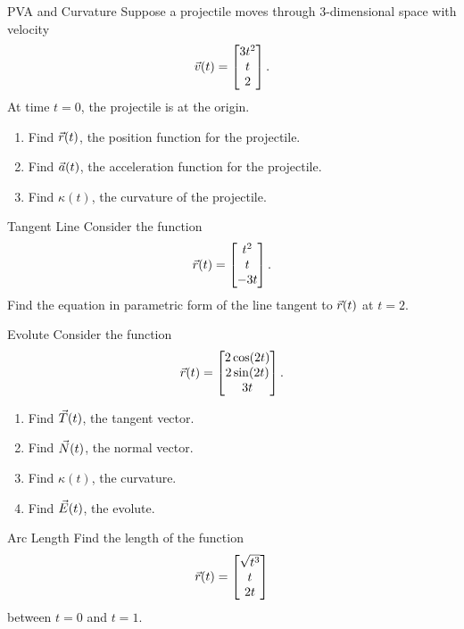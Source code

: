 \begin{revex}{PVA and Curvature}
Suppose a projectile moves through 3-dimensional space with velocity $$\vec{v}(t)=\begin{bmatrix}3t^2\\t\\2\end{bmatrix}. $$
At time $t=0$, the projectile is at the origin.
\vspace{1em}
\begin{enumerate}
\item Find $\vec{r}(t)$, the position function for the projectile.
\vspace{1em}
\item Find $\vec{a}(t)$, the acceleration function for the projectile.
\vspace{1em}
\item Find $\kappa(t)$, the curvature of the projectile.
\end{enumerate}
\end{revex}

\begin{revex}{Tangent Line}
Consider the function $$\vec{r}(t)=\begin{bmatrix}t^2\\t\\-3t\end{bmatrix}. $$
Find the equation in parametric form of the line tangent to $\vec{r}(t)$ at $t=2$.
\end{revex}

\begin{revex}{Evolute}
Consider the function $$\vec{r}(t)=\begin{bmatrix}2\cos(2t)\\2\sin(2t)\\3t\end{bmatrix}. $$
\begin{enumerate}
\item Find $\vec{T}(t)$, the tangent vector.
\vspace{1em}
\item Find $\vec{N}(t)$, the normal vector.
\vspace{1em}
\item Find $\kappa(t)$, the curvature.
\vspace{1em}
\item Find $\vec{E}(t)$, the evolute.
\end{enumerate}
\end{revex}

\begin{revex}{Arc Length}
Find the length of the function $$\vec{r}(t)=\begin{bmatrix}\sqrt{t^3}\\t\\2t\end{bmatrix} $$ between $t=0$ and $t=1$.
\end{revex}